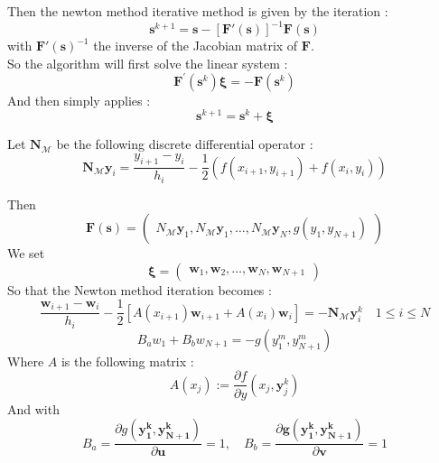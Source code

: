 \documentclass[10pt,a4paper,twocolumn]{article}
\begin{document}
Then the newton method iterative method is given by the  iteration : 
\[\textbf{s}^{k+1} =  \textbf{s} - \left[\textbf{F}'(\textbf{s}) \right]^{-1} \textbf{F}(\textbf{s}) \]
with $\textbf{F}'(\textbf{s})^{-1} $ the inverse of the Jacobian matrix of $\textbf{F}$. \\ 
So the algorithm will first solve the linear system : 
\begin{equation}
\mathbf{F}^{\prime}\left(\mathbf{s}^{k}\right) \boldsymbol{\xi}=-\mathbf{F}\left(\mathbf{s}^{k}\right)
\end{equation} 
And then simply applies : 
\begin{equation}
\textbf{s}^{k+1} = \textbf{s}^{k} + \boldsymbol{\xi}
\end{equation} 

Let $\textbf{N}_{\mathcal{M}}$ be the following discrete differential operator : 
\[ \textbf{N}_{\mathcal{M}} \textbf{y}_i = \frac{y_{i+1}-y_{i}}{h_{i}}-\frac{1}{2}\left(f\left(x_{i+1}, y_{i+1}\right)+f\left(x_{i}, y_{i}\right)\right) \]

Then \[ \textbf{F}(\textbf{s}) = \begin{pmatrix}
N_{\mathcal{M}}\textbf{y}_1,
N_{\mathcal{M}}\textbf{y}_1,
\dots, 
N_{\mathcal{M}}\textbf{y}_N,
g(y_1, y_{N+1})
\end{pmatrix}
 \] 
We set
\[  \boldsymbol{\xi} = \begin{pmatrix}
\textbf{w}_1 ,
\textbf{w}_2 ,
\dots ,
\textbf{w}_N ,
\textbf{w}_{N+1}
\end{pmatrix}
\]
So that the Newton method iteration becomes : 
\begin{equation}
\frac{\mathbf{w}_{i+1}-\mathbf{w}_{i}}{h_{i}}-\frac{1}{2}\left[A\left(x_{i+1}\right) \mathbf{w}_{i+1}+A\left(x_{i}\right) \mathbf{w}_{i}\right]=-\mathbf{N}_{\mathcal{M}} \mathbf{y}_{i}^{k	} \quad 1 \leq i \leq N
\end{equation}
\begin{equation}
B_{a} w_{1}+B_{b} w_{N+1}=-g\left(y_{1}^{m}, y_{N+1}^{m}\right)
\end{equation}
Where $A$ is the following matrix : 
$$
A\left(x_{j}\right):=\frac{\partial f}{\partial y}\left(x_{j},{\mathbf{y}}_{j}^{k}\right)
$$
And with $$
B_{a}=\frac{\partial g(\mathbf{y_1^k}, \mathbf{y_{N+1}^k})}{\partial \mathbf{u}} = 1, \quad B_{b}=\frac{\partial \mathbf{g}(\mathbf{y_1^k}, \mathbf{y_{N+1}^k})}{\partial \mathbf{v}} = 1
$$
\end{document}
